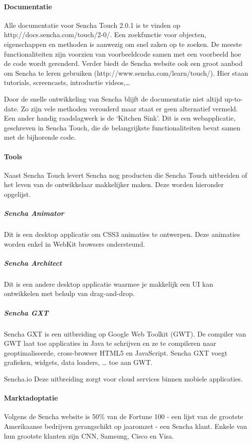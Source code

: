 \paragraph{Documentatie}
Alle documentatie voor Sencha Touch 2.0.1 is te vinden op http://docs.sencha.com/touch/2-0/.  Een zoekfunctie voor objecten,  eigenschappen en methoden is aanwezig om snel zaken op te zoeken.  De meeste functionaliteiten zijn voorzien van voorbeeldcode samen met een voorbeeld hoe de code wordt gerenderd.  Verder biedt de Sencha website ook een groot aanbod om Sencha te leren gebruiken (http://www.sencha.com/learn/touch/).  Hier staan tutorials,  screencasts,  introductie videos,…

Door de snelle ontwikkeling van Sencha blijft de documentatie niet altijd up-to-date.  Zo zijn vele methoden verouderd maar staat er geen alternatief vermeld. Een ander handig raadslagwerk is de ‘Kitchen Sink'.  Dit is een webapplicatie,  geschreven in Sencha Touch,  die de belangrijkste functionaliteiten bevat samen met de bijhorende code.  

\paragraph{Tools}
Naast Sencha Touch levert Sencha nog producten die Sencha Touch uitbreiden of het leven van de ontwikkelaar makkelijker maken.  Deze worden hieronder opgelijst.  

\subparagraph{Sencha Animator}
Dit is een desktop applicatie om CSS3 animaties te ontwerpen.  Deze animaties worden enkel in WebKit browsers ondersteund.

\subparagraph{Sencha Architect}
Dit is een andere desktop applicatie waarmee je makkelijk een UI kan ontwikkelen met behulp van drag-and-drop.  

\subparagraph{Sencha GXT}
Sencha GXT is een uitbreiding op Google Web Toolkit (GWT).  De compiler van GWT laat toe applicaties in Java te schrijven en ze te compileren naar geoptimaliseerde,  cross-browser HTML5 en JavaScript.  Sencha GXT voegt grafieken,  widgets,  data loaders, … toe aan GWT.

Sencha.io
Deze uitbreiding zorgt voor cloud services binnen mobiele applicaties.  

\paragraph{Marktadoptatie}
Volgens de Sencha website is 50\% van de Fortune 100 - een lijst van de grootste Amerikaanse bedrijven gerangschikt op jaaromzet - een Sencha klant.  Enkele van hun grootste klanten zijn CNN,  Samsung,  Cisco en  Visa.

